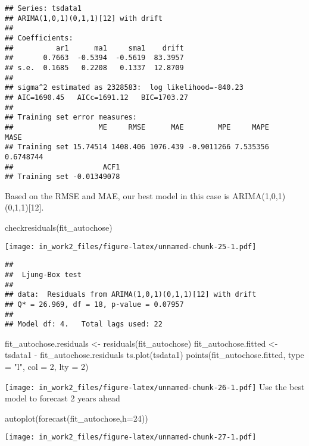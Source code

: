 \documentclass[
]{article}
\newenvironment{Shaded}{\begin{snugshade}}{\end{snugshade}}
\newcommand{\AttributeTok}[1]{\textcolor[rgb]{0.77,0.63,0.00}{#1}}
\newcommand{\DecValTok}[1]{\textcolor[rgb]{0.00,0.00,0.81}{#1}}
\newcommand{\FunctionTok}[1]{\textcolor[rgb]{0.00,0.00,0.00}{#1}}
\newcommand{\NormalTok}[1]{#1}
\newcommand{\OtherTok}[1]{\textcolor[rgb]{0.56,0.35,0.01}{#1}}
\newcommand{\SpecialCharTok}[1]{\textcolor[rgb]{0.00,0.00,0.00}{#1}}
\newcommand{\StringTok}[1]{\textcolor[rgb]{0.31,0.60,0.02}{#1}}
\begin{document}
\begin{verbatim}
## Series: tsdata1 
## ARIMA(1,0,1)(0,1,1)[12] with drift 
## 
## Coefficients:
##          ar1      ma1     sma1    drift
##       0.7663  -0.5394  -0.5619  83.3957
## s.e.  0.1685   0.2208   0.1337  12.8709
## 
## sigma^2 estimated as 2328583:  log likelihood=-840.23
## AIC=1690.45   AICc=1691.12   BIC=1703.27
## 
## Training set error measures:
##                    ME     RMSE      MAE        MPE     MAPE      MASE
## Training set 15.74514 1408.406 1076.439 -0.9011266 7.535356 0.6748744
##                     ACF1
## Training set -0.01349078
\end{verbatim}

Based on the RMSE and MAE, our best model in this case is
ARIMA(1,0,1)(0,1,1){[}12{]}.

\begin{Shaded}
\begin{Highlighting}[]
\FunctionTok{checkresiduals}\NormalTok{(fit\_autochose)}
\end{Highlighting}
\end{Shaded}

\texttt{[image: in\_work2\_files/figure-latex/unnamed-chunk-25-1.pdf]}

\begin{verbatim}
## 
##  Ljung-Box test
## 
## data:  Residuals from ARIMA(1,0,1)(0,1,1)[12] with drift
## Q* = 26.969, df = 18, p-value = 0.07957
## 
## Model df: 4.   Total lags used: 22
\end{verbatim}

\begin{Shaded}
\begin{Highlighting}[]
\NormalTok{fit\_autochose.residuals }\OtherTok{\textless{}{-}} \FunctionTok{residuals}\NormalTok{(fit\_autochose)}
\NormalTok{fit\_autochose.fitted }\OtherTok{\textless{}{-}}\NormalTok{ tsdata1 }\SpecialCharTok{{-}}\NormalTok{ fit\_autochose.residuals}
\FunctionTok{ts.plot}\NormalTok{(tsdata1)}
\FunctionTok{points}\NormalTok{(fit\_autochose.fitted, }\AttributeTok{type =} \StringTok{"l"}\NormalTok{, }\AttributeTok{col =} \DecValTok{2}\NormalTok{, }\AttributeTok{lty =} \DecValTok{2}\NormalTok{)}
\end{Highlighting}
\end{Shaded}

\texttt{[image: in\_work2\_files/figure-latex/unnamed-chunk-26-1.pdf]} Use
the best model to forecast 2 years ahead

\begin{Shaded}
\begin{Highlighting}[]
\FunctionTok{autoplot}\NormalTok{(}\FunctionTok{forecast}\NormalTok{(fit\_autochose,}\AttributeTok{h=}\DecValTok{24}\NormalTok{))}
\end{Highlighting}
\end{Shaded}

\texttt{[image: in\_work2\_files/figure-latex/unnamed-chunk-27-1.pdf]}
\end{document}
